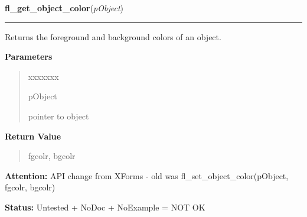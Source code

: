 \hspace{.8\funcindent}\begin{boxedminipage}{\funcwidth}

    \raggedright \textbf{fl\_get\_object\_color}(\textit{pObject})

    \vspace{-1.5ex}

    \rule{\textwidth}{0.5\fboxrule}
\setlength{\parskip}{2ex}
    Returns the foreground and background colors of an object.

\setlength{\parskip}{1ex}
      \textbf{Parameters}
      \vspace{-1ex}

      \begin{quote}
        \begin{Ventry}{xxxxxxx}

          \item[pObject]

          pointer to object

        \end{Ventry}

      \end{quote}

      \textbf{Return Value}
    \vspace{-1ex}

      \begin{quote}
      fgcolr, bgcolr

      \end{quote}

\textbf{Attention:} API change from XForms - old was fl\_set\_object\_color(pObject, fgcolr, 
bgcolr)



\textbf{Status:} Untested + NoDoc + NoExample = NOT OK



    \end{boxedminipage}

    \label{xformslib:library:fl_set_object_label}

    \vspace{0.5ex}

